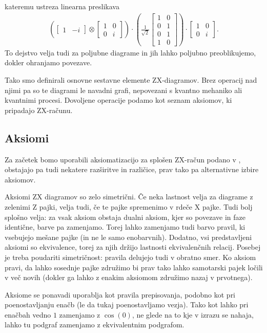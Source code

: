 \documentclass[mat1]{fmfdelo}
\begin{document}
kateremu ustreza linearna preslikava 
\begin{align*}
    \left(\begin{bmatrix}
        1&-i
    \end{bmatrix}\otimes\begin{bmatrix}
        1&0\\0&i
    \end{bmatrix}\right)\cdot \left(\frac{1}{\sqrt2}\begin{bmatrix}
        1&0\\
        0&1\\
        0&1\\
        1&0
    \end{bmatrix}\right) \cdot \begin{bmatrix}
        1&0\\0&i
    \end{bmatrix}.
\end{align*}
To dejstvo velja tudi za poljubne diagrame in jih lahko poljubno preoblikujemo, dokler ohranjamo povezave.

Tako smo definirali osnovne sestavne elemente ZX-diagramov. Brez operacij nad njimi pa so te diagrami le navadni grafi, nepovezani s kvantno mehaniko ali kvantnimi procesi. Dovoljene operacije podamo kot seznam aksiomov, ki pripadajo ZX-računu.
\subsection{Aksiomi}
Za začetek bomo uporabili aksiomatizacijo za splošen ZX-račun podano v \cite[poglavje 2.2]{vilmart}, obstajajo pa tudi nekatere razširitve in različice, prav tako pa alternativne izbire aksiomov.

Aksiomi ZX diagramov so zelo simetrični. Če neka lastnost velja za diagrame z zelenimi Z pajki, velja tudi, če te pajke spremenimo v rdeče X pajke. Tudi bolj splošno velja: za vsak aksiom obstaja dualni aksiom, kjer so povezave in faze identične, barve pa zamenjamo. Torej lahko zamenjamo tudi barvo pravil, ki vsebujejo mešane pajke (in ne le samo enobarvnih). Dodatno, vsi predstavljeni aksiomi so ekvivalence, torej za njih držijo lastnosti ekvivalenčnih relacij. Posebej je treba poudariti simetričnost: pravila delujejo tudi v obratno smer. Ko aksiom pravi, da lahko sosednje pajke združimo bi prav tako lahko samotarski pajek ločili v več novih (dokler ga lahko z enakim aksiomom združimo nazaj v prvotnega).

Aksiome se ponavadi uporablja kot pravila prepisovanja, podobno kot pri poenostavljanju enačb (le da tukaj poenostavljamo vezja). Tako kot lahko pri enačbah vedno \(1\) zamenjamo z \(\cos(0)\), ne glede na to kje v izrazu se nahaja, lahko tu podgraf zamenjamo z ekvivalentnim podgrafom.
\end{document}
